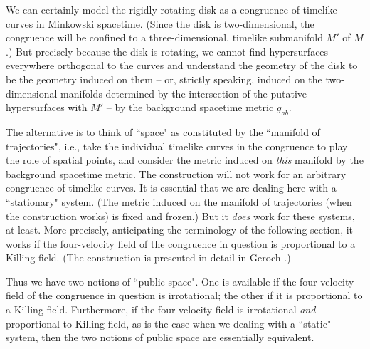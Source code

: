\documentclass [12] {article}
\theoremstyle{plain}
\numberwithin{figure}{subsection}
\numberwithin{proposition}{subsection}
\begin{document}
We can certainly model the rigidly rotating disk as a congruence of timelike curves in Minkowski spacetime. (Since the disk is two-dimensional, the congruence will be confined to a three-dimensional, timelike submanifold  $M'$ of $M$.)  But precisely because the disk is rotating, we cannot find hypersurfaces everywhere orthogonal to the curves and understand the geometry of the disk to be the geometry induced on them -- or, strictly speaking, induced on the two-dimensional manifolds determined by the intersection of the putative hypersurfaces with $M'$ -- by the background spacetime metric $g_{ab}$.

The alternative  is to think of ``space" as constituted by the ``manifold of trajectories", i.e., take the individual timelike curves in the congruence to play the role of spatial points, and consider the metric induced on \emph{this} manifold by the background spacetime metric.   The construction will not work for an arbitrary congruence of timelike curves.  It is essential that we are dealing here with a ``stationary" system.  (The metric induced on the manifold of trajectories (when the construction works) is fixed and frozen.) But it  \emph{does}  work for these systems, at least.  More precisely, anticipating the terminology of the following section, it works  if the four-velocity field of the congruence in question is proportional to a Killing field.  (The construction is presented in detail in Geroch .) 

Thus  we have two notions  of ``public space". One is available if the  four-velocity field of the congruence in question is irrotational; the other if it is proportional to a  Killing field. Furthermore,  if the four-velocity field is irrotational  \emph{and} proportional to Killing field, as is the case when we dealing with a ``static" system,  then the two notions of public space are essentially equivalent.

\end{document}
